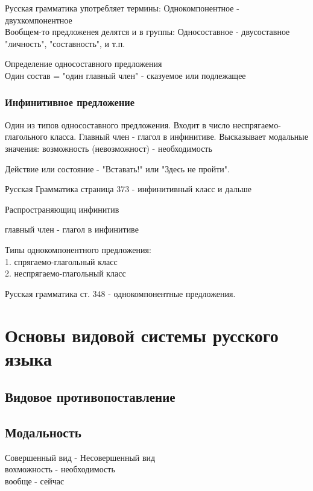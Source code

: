 \documentclass{article}
\begin{document}
Русская грамматика употребляет термины:
Однокомпонентное - двухкомпонентное \\

Вообщем-то предложенея делятся и в группы:
Односоставное - двусоставное \\

"личность", "составность", и т.п.


Определение односоставного предложения  \\

Один состав = "один главный член" -  сказуемое или подлежащее

\subsubsection{Инфинитивное предложение}

Один из типов односоставного предложения. Входит в число неспрягаемо-глагольного класса. Главный член - глагол в инфинитиве. Высказывает модальные значения: возможность (невозможност) - необходимость 

Действие или состояние - "Вставать!" или "Здесь не пройти".

Русская Грамматика страница 373 - инфинитивный класс и дальше

Распространяющиц инфинитив

главный член - глагол в инфинитиве

Типы однокомпонентного предложения: \\ 
	1. спрягаемо-глагольный класс \\
	2. неспрягаемо-глагольный класс

Русская грамматика ст. 348 - однокомпонентные предложения.

\section{Основы видовой системы русского языка}

\subsection{Видовое противопоставление}

\subsection{Модальность}
	Совершенный вид -	Несовершенный вид \\
	вохможность 	- 	необходимость \\
	вообще 			-	сейчас \\
\end{document}
